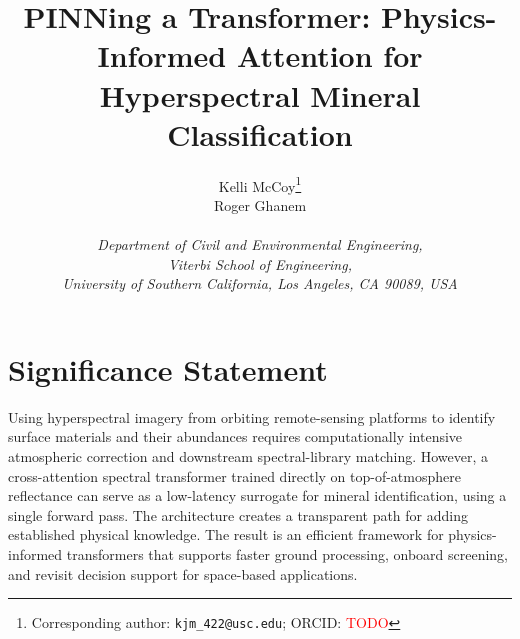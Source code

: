 \documentclass[11pt]{article}
\title{PINNing a Transformer: Physics-Informed Attention for Hyperspectral Mineral Classification}
\author{%
Kelli McCoy\thanks{Corresponding author: \texttt{kjm\_422@usc.edu}; ORCID: \textcolor{red}{TODO}}\\
Roger Ghanem\\
\\
\textit{Department of Civil and Environmental Engineering,}\\
\textit{Viterbi School of Engineering,}\\
\textit{University of Southern California, Los Angeles, CA 90089, USA}
}
\date{}
\begin{document}
\maketitle

\section*{Significance Statement}
\noindent
Using hyperspectral imagery from orbiting remote-sensing platforms to identify surface materials and their abundances requires computationally intensive atmospheric correction and downstream spectral-library matching.
However, a cross-attention spectral transformer trained directly on top-of-atmosphere reflectance can serve as a low-latency surrogate for mineral identification, using a single forward pass.
The architecture creates a transparent path for adding established physical knowledge.
The result is an efficient framework for physics-informed transformers that supports faster ground processing, onboard screening, and revisit decision support for space-based applications.

\end{document}
